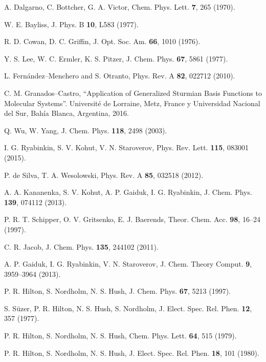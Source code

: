 \begin{thebibliography}{9}
A. Dalgarno, C. Bottcher, G. A. Victor, 
Chem. Phys. Lett. \textbf{7}, 265 (1970).

W. E. Bayliss,
J. Phys. B \textbf{10}, L583 (1977).

R. D. Cowan, D. C. Griffin, 
J. Opt. Soc. Am. \textbf{66}, 1010 (1976).

Y. S. Lee, W. C. Ermler, K. S. Pitzer, 
J. Chem. Phys. \textbf{67}, 5861 (1977).

L. Fernández--Menchero and S. Otranto, 
Phys. Rev. A {\bf 82}, 022712 (2010).

C. M. Granados--Castro, 
``Application of Generalized Sturmian Basis Functions to
Molecular Systems''. 
Universit\'e de Lorraine, Metz, France y Universidad Nacional del Sur, 
Bah\'ia Blanca, Argentina, 2016.


Q. Wu, W. Yang,
J. Chem. Phys. \textbf{118}, 2498 (2003).

I. G. Ryabinkin, S. V. Kohut, V. N. Staroverov,
Phys. Rev. Lett. \textbf{115}, 083001 (2015).

P. de Silva, T. A. Wesolowski,
Phys. Rev. A \textbf{85}, 032518 (2012).

A. A. Kananenka, S. V. Kohut, A. P. Gaiduk, I. G. Ryabinkin, 
J. Chem. Phys. \textbf{139}, 074112 (2013).

P. R. T. Schipper, O. V. Gritsenko, E. J. Baerends,
Theor. Chem. Acc. \textbf{98}, 16--24 (1997).

C. R. Jacob,
J. Chem. Phys. \textbf{135}, 244102 (2011).

A. P. Gaiduk, I. G. Ryabinkin, V. N. Staroverov, 
J. Chem. Theory Comput. \textbf{9}, 3959--3964 (2013).

P. R. Hilton, S. Nordholm, N. S. Hush, 
J. Chem. Phys. \textbf{67}, 5213 (1997).

S. S{\"u}zer, P. R. Hilton, N. S. Hush, S. Nordholm,
J. Elect. Spec. Rel. Phen. \textbf{12}, 357 (1977).

P. R. Hilton, S. Nordholm, N. S. Hush,
Chem. Phys. Lett. \textbf{64}, 515 (1979).

P. R. Hilton, S. Nordholm, N. S. Hush, 
J. Elect. Spec. Rel. Phen. \textbf{18}, 101 (1980).


\end{thebibliography}

